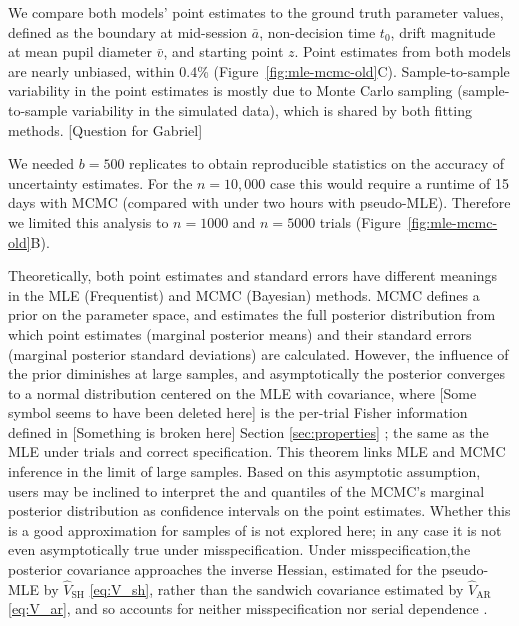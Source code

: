 \documentclass[00-main.tex]{subfiles}
\begin{document}
We compare both models' point estimates to the ground truth parameter values, defined as the boundary at mid-session $\bar{a}$, non-decision time $t_0$, drift magnitude at mean pupil diameter $\bar{v}$, and starting point $z$. Point estimates from both models are nearly unbiased, within 0.4\% (Figure~\ref{fig:mle-mcmc-old}C). Sample-to-sample variability in the point estimates is mostly due to Monte Carlo sampling (sample-to-sample variability in the simulated data), which is shared by both fitting methods.
[Question for Gabriel]

We needed $b=500$ replicates to obtain reproducible statistics on the accuracy of uncertainty estimates. For the  $n=10{,}000$ case this would require a runtime of 15 days with MCMC (compared with under two hours with pseudo-MLE). Therefore we limited this analysis to $n=1000$  and $n=5000$ trials (Figure~\ref{fig:mle-mcmc-old}B).

Theoretically, both point estimates and standard errors have different meanings in the MLE (Frequentist) and MCMC (Bayesian) methods. MCMC defines a prior on the parameter space, and estimates the full posterior distribution from which point estimates (marginal posterior means) and their standard errors (marginal posterior standard deviations) are calculated. However, the influence of the prior diminishes at large samples, and asymptotically the posterior converges to a normal distribution centered on the MLE with covariance, where [Some symbol seems to have been deleted here]  is the per-trial Fisher information defined in [Something is broken here] Section \ref{sec:properties} \citep{van_der_vaart_asymptotic_1998}; the same as the MLE under  trials and correct specification.  This theorem links MLE and MCMC inference in the limit of large samples. Based on this asymptotic assumption, users may be inclined to interpret the  and  quantiles of the MCMC's marginal posterior distribution as  confidence intervals on the point estimates. Whether this is a good approximation for samples of   is not explored here; in any case it is not even asymptotically true under misspecification. Under misspecification,the posterior covariance approaches the inverse Hessian, estimated for the pseudo-MLE by $\widehat{V}_\text{SH}$ \eqref{eq:V_sh}, rather than the sandwich covariance estimated by $\widehat{V}_\text{AR}$ \eqref{eq:V_ar}, and so accounts for neither misspecification nor serial dependence \citep{shaby_open-faced_2014}.
\end{document}
